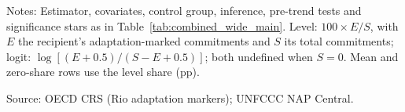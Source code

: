\begin{table}[H]
\centering
\caption{Effect of NAP adoption on the within-country adaptation share of reported commitments}
\label{tab:within_share_wide}
\begingroup\small
{}
\endgroup
\par\vspace{4pt}
\begin{minipage}{\linewidth}\footnotesize
Notes: Estimator, covariates, control group, inference, pre-trend tests and significance stars as in Table~\ref{tab:combined_wide_main}. Level: $100 \times E/S$, with $E$ the recipient's adaptation-marked commitments and $S$ its total commitments; logit: $\log[(E+0.5)/(S-E+0.5)]$; both undefined when $S=0$. Mean and zero-share rows use the level share (pp).\par
Source: OECD CRS (Rio adaptation markers); UNFCCC NAP Central.
\end{minipage}
\end{table}
